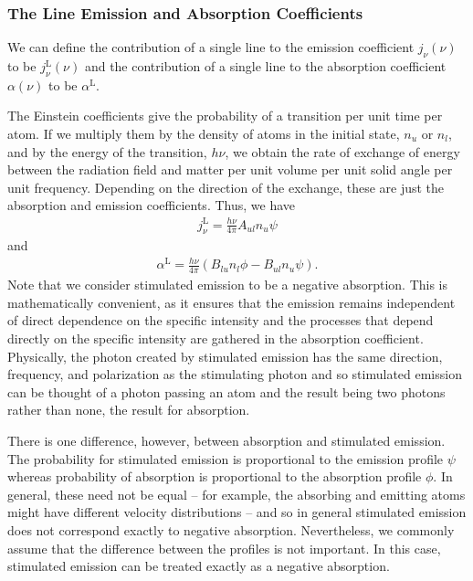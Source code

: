 \subsubsection{The Line Emission and Absorption Coefficients}

We can define the contribution of a single line to the
emission coefficient $j_\nu(\nu)$ to be
$j_\nu^\mathrm{L}(\nu)$ and the contribution of a single
line to the absorption coefficient $\alpha(\nu)$ to be
$\alpha^\mathrm{L}$.

The Einstein coefficients give the probability of a transition per unit
time per atom. If we multiply them by the density of atoms in the
initial state, $n_u$ or $n_l$, and by the energy of the transition,
$h\nu$, we obtain the rate of exchange of energy between the radiation
field and matter per unit volume per unit solid angle per unit
frequency. Depending on the direction of the exchange, these are just
the absorption and emission coefficients. Thus, we have
\begin{align}
j_\nu^\mathrm{L} = \frac{h\nu}{4\pi} A_{ul} n_u \psi
\end{align}
and
\begin{align}
\alpha^\mathrm{L} = \frac{h\nu}{4\pi} (B_{lu} n_l
\phi - B_{ul} n_u\psi).
\end{align}
Note that we consider stimulated emission to be a negative
absorption. This is mathematically convenient, as it ensures
that the emission remains independent of direct dependence
on the specific intensity and the processes that depend
directly on the specific intensity are gathered in the
absorption coefficient. Physically, the photon created by
stimulated emission has the same direction, frequency, and
polarization as the stimulating photon and so stimulated
emission can be thought of a photon passing an atom and the
result being two photons rather than none, the result for
absorption.

There is one difference, however, between absorption and
stimulated emission. The probability for stimulated emission
is proportional to the emission profile $\psi$ whereas
probability of absorption is proportional to the absorption
profile $\phi$. In general, these need not be equal --
for example, the absorbing and emitting atoms might have
different velocity distributions -- and so in general
stimulated emission does not correspond exactly to negative
absorption. Nevertheless, we commonly assume that the
difference between the profiles is not important. In this
case, stimulated emission can be treated exactly as a
negative absorption.

